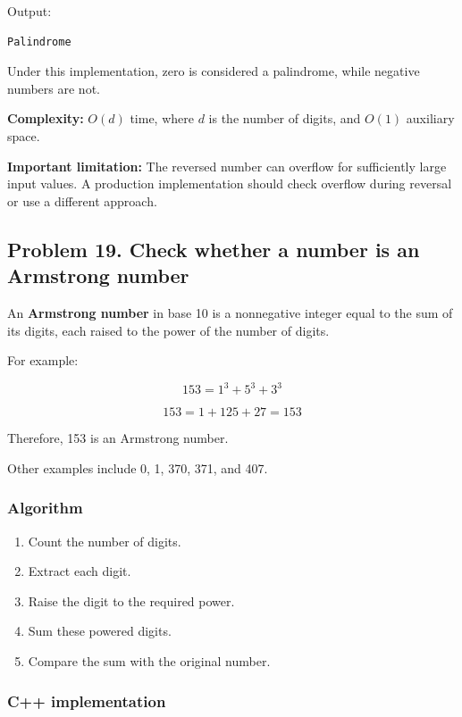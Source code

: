 Output:

\begin{lstlisting}[style=pseudocode]
Palindrome
\end{lstlisting}

Under this implementation, zero is considered a palindrome, while negative numbers are not.

\textbf{Complexity:} $O(d)$ time, where $d$ is the number of digits, and $O(1)$ auxiliary space.

\textbf{Important limitation:} The reversed number can overflow for sufficiently large input values. A production implementation should check overflow during reversal or use a different approach.

\subsection{Problem 19. Check whether a number is an Armstrong number}

An \textbf{Armstrong number} in base 10 is a nonnegative integer equal to the sum of its digits, each raised to the power of the number of digits.

For example:


\[
153=1^3+5^3+3^3
\]



\[
153=1+125+27=153
\]


Therefore, 153 is an Armstrong number.

Other examples include 0, 1, 370, 371, and 407.

\subsubsection{Algorithm}

\begin{enumerate}
    \item Count the number of digits.
    \item Extract each digit.
    \item Raise the digit to the required power.
    \item Sum these powered digits.
    \item Compare the sum with the original number.
\end{enumerate}

\subsubsection{C++ implementation}

